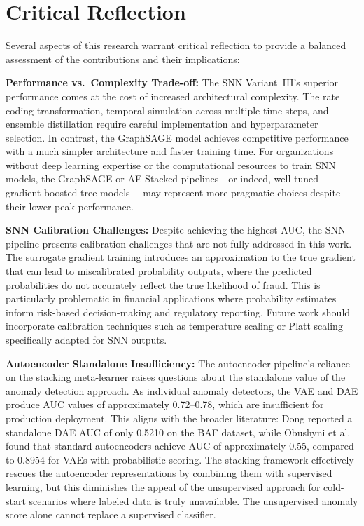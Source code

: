 \section{Critical Reflection}

Several aspects of this research warrant critical reflection to provide a balanced assessment of the contributions and their implications:

\textbf{Performance vs.\ Complexity Trade-off:} The SNN Variant~III's superior performance comes at the cost of increased architectural complexity. The rate coding transformation, temporal simulation across multiple time steps, and ensemble distillation require careful implementation and hyperparameter selection. In contrast, the GraphSAGE model achieves competitive performance with a much simpler architecture and faster training time. For organizations without deep learning expertise or the computational resources to train SNN models, the GraphSAGE or AE-Stacked pipelines---or indeed, well-tuned gradient-boosted tree models \cite{grinsztajn2022tree}---may represent more pragmatic choices despite their lower peak performance.

\textbf{SNN Calibration Challenges:} Despite achieving the highest AUC, the SNN pipeline presents calibration challenges that are not fully addressed in this work. The surrogate gradient training introduces an approximation to the true gradient that can lead to miscalibrated probability outputs, where the predicted probabilities do not accurately reflect the true likelihood of fraud. This is particularly problematic in financial applications where probability estimates inform risk-based decision-making and regulatory reporting. Future work should incorporate calibration techniques such as temperature scaling or Platt scaling specifically adapted for SNN outputs.

\textbf{Autoencoder Standalone Insufficiency:} The autoencoder pipeline's reliance on the stacking meta-learner raises questions about the standalone value of the anomaly detection approach. As individual anomaly detectors, the VAE and DAE produce AUC values of approximately 0.72--0.78, which are insufficient for production deployment. This aligns with the broader literature: Dong \cite{dong2025enhanced} reported a standalone DAE AUC of only 0.5210 on the BAF dataset, while Obushyni et al. \cite{obushyni2025vae} found that standard autoencoders achieve AUC of approximately 0.55, compared to 0.8954 for VAEs with probabilistic scoring. The stacking framework effectively rescues the autoencoder representations by combining them with supervised learning, but this diminishes the appeal of the unsupervised approach for cold-start scenarios where labeled data is truly unavailable. The unsupervised anomaly score alone cannot replace a supervised classifier.

